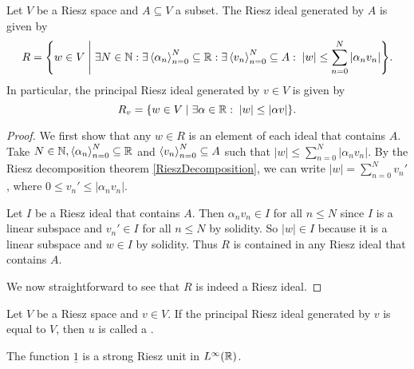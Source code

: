 \begin{lemma} \label{generatedRieszIdeals}
Let $V$ be a Riesz space and $A\subseteq V$ a subset. The Riesz ideal generated by $A$ is given by
\[ R = \setbuilder{w\in V}{\exists N\in \N: \exists \seq{\alpha_n}_{n=0}^N \subseteq \R: \exists \seq{v_n}_{n=0}^N \subseteq A: \; |w| \leq \sum_{n=0}^N |\alpha_nv_n|}. \]
In particular, the principal Riesz ideal generated by $v\in V$ is given by
\[ R_v = \setbuilder{w\in V}{\exists \alpha\in \R: \; |w|\leq |\alpha v|}. \]
\end{lemma}
\begin{proof}
We first show that any $w\in R$ is an element of each ideal that contains $A$. Take $N\in \mathbb{N}, \left\langle \alpha_n \right\rangle_{n=0}^N \subseteq \mathbb{R}$ and $\left\langle v_n \right\rangle_{n=0}^N \subseteq A$ such that $|w| \leq \sum_{n=0}^N |\alpha_nv_n|$. By the Riesz decomposition theorem \ref{RieszDecomposition}, we can write $|w| = \sum_{n=0}^N v_{n}'$, where $0\leq v_n' \leq |\alpha_nv_n|$.

Let $I$ be a Riesz ideal that contains $A$. Then $\alpha_nv_n \in I$ for all $n\leq N$ since $I$ is a linear subspace and $v_n'\in I$ for all $n\leq N$ by solidity. So $|w|\in I$ because it is a linear subspace and $w\in I$ by solidity. Thus $R$ is contained in any Riesz ideal that contains $A$.

We now straightforward to see that $R$ is indeed a Riesz ideal.
\end{proof}

\begin{definition}
Let $V$ be a Riesz space and $v\in V$. If the principal Riesz ideal generated by $v$ is equal to $V$, then $u$ is called a .
\end{definition}

\begin{example}
The function $\underline{1}$ is a strong Riesz unit in $L^\infty(\mathbb{R})$.
\end{example}

